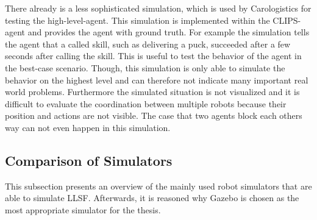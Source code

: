 \documentclass[a4paper,11pt]{article}
\begin{document}
There already is a less sophisticated simulation, which is used by Carologistics for testing the high-level-agent. This simulation is implemented within the CLIPS-agent and provides the agent with ground truth. For example the simulation tells the agent that a called skill, such as delivering a puck, succeeded after a few seconds after calling the skill. This is useful to test the behavior of the agent in the best-case scenario. Though, this simulation is only able to simulate the behavior on the highest level and can therefore not indicate many important real world problems. Furthermore the simulated situation is not visualized and it is difficult to evaluate the coordination between multiple robots because their position and actions are not visible. The case that two agents block each others way can not even happen in this simulation.

\subsection{Comparison of Simulators}
This subsection presents an overview of the mainly used robot simulators that are able to simulate LLSF. Afterwards, it is reasoned why Gazebo is chosen as the most appropriate simulator for the thesis.
\end{document}
